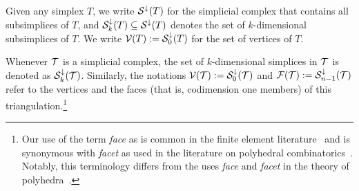 \documentclass[10pt,a4paper]{article}
\newcommand{\mwl}[1]{{\color{red}#1}}
\begin{document}

Given any simplex $T$, we write ${\mathcal S}^{\downarrow}(T)$ for the simplicial complex that contains all subsimplices of $T$,
and ${\mathcal S}^{\downarrow}_{{k}}(T) \subseteq {\mathcal S}^{\downarrow}(T)$ denotes the set of $k$-dimensional subsimplices of $T$. 
We write ${\mathcal V}(T) := {\mathcal S}^{\downarrow}_{0}(T)$ for the set of vertices of $T$.

Whenever ${\mathcal T}$ is a simplicial complex, 
the set of $k$-dimensional simplices in ${\mathcal T}$ is denoted as ${\mathcal S}^{\downarrow}_{{k}}({\mathcal T})$. 
Similarly, the notations ${\mathcal V}({\mathcal T}) := {\mathcal S}^{\downarrow}_{0}({\mathcal T})$ and ${\mathcal F}({\mathcal T}) := {\mathcal S}^{\downarrow}_{n-1}({\mathcal T})$ refer to the vertices and the faces (that is, codimension one members) of this triangulation.\footnote{
    Our use of the term \textit{face} as is common in the finite element literature~\cite{brenner2008mathematical}
    and is synonymous with \textit{facet} as used in the literature on polyhedral combinatorics~\cite{schrijver1998theory}.
    Notably, this terminology differs from the uses \textit{face} and \textit{facet} in the theory of polyhedra~\cite{ziegler1995lectures}.
}
\end{document}
